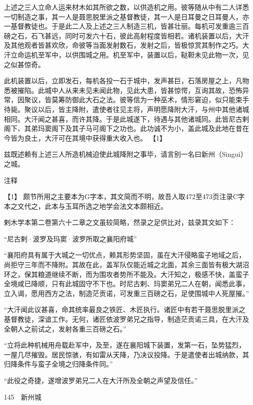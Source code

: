\documentclass[12pt,UTF8]{ctexbook}
\begin{document}
上述之三人立命人运来材木如其所欲之数，以供造机之用。彼等随从中有二人详悉一切制造之事，其一人是聂思脱里派之基督教徒，其一人是日耳曼之日耳曼人，亦一基督教徒也。于是此二人及上述之三人制造三机，皆甚壮丽。每机可发重逾三百磅之石，石飞甚远，同时可发六十石，彼此高射程度皆相若。诸机装置以后，大汗及其他观者皆甚欢欣，命彼等当面发射数石，发射之后，皆极惊赏其制作之巧。大汗立命运机至军中，以供围城之用。机至军中，装置以后，鞑靼未见此物一次，见之似甚惊奇。

此机装置以后，立即发石，每机各投一石于城中，发声甚巨，石落房屋之上，凡物悉被摧陷。此城中人从来未见未闻此物，见此大患，皆甚惊愕，互询其故，恐怖异常，因聚议，皆莫筹防御此大石之法。彼等信为一种巫术，情形窘迫，似只能束手待毙。聚议以后，皆主降附，遣使者往见主将，声明愿降附大汗，与州中其他诸城相同。大汗闻之甚喜，而许其降。于是此城遂下，待遇与其他诸城同。此皆尼古剌阁下、其弟玛窦阁下及其子马可阁下之功也。此功诚不为小，盖此城及此地在昔在今皆为良土，大汗可在其境中获得重大收入也。 【1】

兹既述赖有上述三人所造机械迫使此城降附之事毕，请言别一名曰新州（Singui）之城。

注释

【1】 颇节所用之主要本为G字本，其文简而不明，故吾人取472至473页注录C字本之文代之，此本与玉耳所选之地学会法文本颇相近。

剌木学本第二卷第六十二章之文虽较简略，然录之足供比对，兹录其文如下：

“尼古剌·波罗及玛窦·波罗所取之襄阳府城”

“襄阳府具有属于大城之一切优点，赖其形势坚固，虽在大汗侵略蛮子地域之后，尚拒守三年而不降附。其故在此，盖军队仅能近城之北面，其余三面皆有极大湖沼环之，保其粮道继续不断，而为围攻者势所不能及。大汗知之，极感不快，盖蛮子全境咸已降顺，只有此城固守不下也。时尼古剌、玛窦弟兄二人在朝，闻悉此事，立入谒，愿用西方之法，制造茫贡诺，可发重三百磅之石，足使围城中人死屋摧。”

“大汗闻此议甚喜，命其统率最良之铁匠、木匠执行。诸匠中有若干聂思脱里派之基督教徒，深谙工作。无何，诸匠依波罗弟兄之指导，制造茫贡诺三具，在大汗及全朝人之前试之，发射各重三百磅之石。”

“立将此种机械用舟载赴军中，及至，遂在襄阳城下装置，发第一石，坠势猛烈，一屋几尽摧毁。居民惊骇，有如雷从天降，乃决议投降。于是遣使者出城纳款，其归降条件与蛮子全境之归降条件同。”

“此役之奇捷，遂增波罗弟兄二人在大汗所及全朝之声望及信任。”





145　新州城
\end{document}
